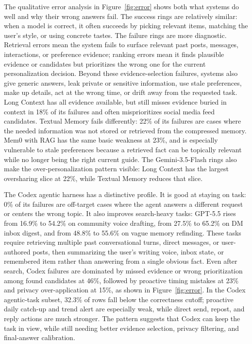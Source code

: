 \documentclass[]{fairmeta}
\begin{document}
The qualitative error analysis in Figure~\ref{fig:error} shows both what systems do well and why their wrong answers fail. The success rings are relatively similar: when a model is correct, it often succeeds by picking relevant items, matching the user's style, or using concrete tastes. The failure rings are more diagnostic. Retrieval errors mean the system fails to surface relevant past posts, messages, interactions, or preference evidence; ranking errors mean it finds plausible evidence or candidates but prioritizes the wrong one for the current personalization decision. Beyond these evidence-selection failures, systems also give generic answers, leak private or sensitive information, use stale preferences, make up details, act at the wrong time, or drift away from the requested task. Long Context has all evidence available, but still misses evidence buried in context in 18\% of its failures and often misprioritizes social media feed candidates. Textual Memory fails differently: 22\% of its failures are cases where the needed information was not stored or retrieved from the compressed memory. Mem0 with RAG has the same basic weakness at 23\%, and is especially vulnerable to stale preferences because a retrieved fact can be topically relevant while no longer being the right current guide. The Gemini-3.5-Flash rings also make the over-personalization pattern visible: Long Context has the largest oversharing slice at 22\%, while Textual Memory reduces that slice.

The Codex agentic harness has a distinctive profile. It is good at staying on task: 0\% of its failures are off-target cases where the agent answers a different request or centers the wrong topic. It also improves search-heavy tasks: GPT-5.5 rises from 16.9\% to 54.2\% on community voice drafting, from 27.5\% to 65.2\% on DM inbox digest, and from 48.8\% to 55.6\% on vague memory refinding. These tasks require retrieving multiple past conversational turns, direct messages, or user-authored posts, then summarizing the user's writing voice, inbox state, or remembered item rather than answering from a single obvious fact. Even after search, Codex failures are dominated by missed evidence or wrong prioritization among found candidates at 46\%, followed by proactive timing mistakes at 23\% and privacy over-application at 15\%, as shown in Figure~\ref{fig:error}. In the Codex agentic-task subset, 32.3\% of rows fall below the correctness cutoff; proactive daily catch-up and trend alert are especially weak, while direct send, repost, and reply actions are much stronger. The pattern suggests that Codex can keep the task in view, while still needing better evidence selection, privacy filtering, and final-answer calibration.
\end{document}
